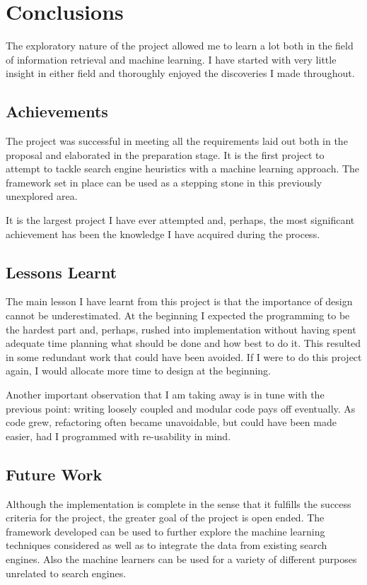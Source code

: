 \documentclass[12pt,notitlepage,twoside]{scrreprt}
\begin{document}
\chapter{Conclusions}
The exploratory nature of the project allowed me to learn a lot both in the field of
information retrieval and machine learning. I have started with very little insight in
either field and thoroughly enjoyed the discoveries I made throughout.

\section{Achievements}
The project was successful in meeting all the requirements laid out both in the proposal
and elaborated in the preparation stage. It is the first project to attempt to tackle search
engine heuristics with a machine learning approach. The framework set in place 
can be used as a stepping stone in this previously unexplored area.

It is the largest project I have ever attempted and, perhaps, the most significant
achievement has been the knowledge I have acquired during the process.

\section{Lessons Learnt}
The main lesson I have learnt from this project is that the importance of design cannot be
underestimated. At the beginning I expected the programming to be the hardest part and,
perhaps, rushed into implementation without having spent adequate time planning what
should be done and how best to do it. This resulted in some redundant work that
could have been avoided. If I were to do this project again, I would allocate more time to
design at the beginning.

Another important observation that I am taking away is in tune with the previous point:
writing loosely coupled and modular code pays off eventually. As code grew, refactoring
often became unavoidable, but could have been made easier, had I programmed with
re-usability in mind.

\section{Future Work}
Although the implementation is complete in the sense that it fulfills the success criteria
for the project, the greater goal of the project is open ended. The framework developed can be
used to further explore the machine learning techniques considered as well as to integrate
the data from existing search engines. Also the machine learners can be used for a
variety of different purposes unrelated to search engines.
\end{document}
